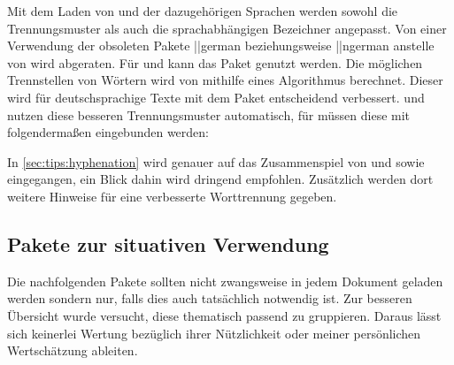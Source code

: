 \begin{DeclarePackages}
  Mit dem Laden von  und der dazugehörigen Sprachen werden 
  sowohl die Trennungsmuster als auch die sprachabhängigen Bezeichner angepasst.
  Von einer Verwendung der obsoleten Pakete \Package||{german} beziehungsweise 
  \Package||{ngerman} anstelle von  wird abgeraten. Für 
   und  kann das Paket  
  genutzt werden.
  Die möglichen Trennstellen von Wörtern wird von  mithilfe 
  eines Algorithmus berechnet. Dieser wird für deutschsprachige Texte mit dem 
  Paket  entscheidend verbessert.  und 
   nutzen diese besseren Trennungsmuster automatisch, für 
   müssen diese mit folgendermaßen eingebunden werden:
  \begin{Code}
    \usepackage[ngerman=ngerman-x-latest]{hyphsubst}
  \end{Code}\vspace{-\baselineskip}%
  In \autoref{sec:tips:hyphenation} wird genauer auf das Zusammenspiel von 
   und  sowie  eingegangen, 
  ein Blick dahin wird dringend empfohlen. Zusätzlich werden dort weitere 
  Hinweise für eine verbesserte Worttrennung gegeben.
\end{DeclarePackages}



\subsection{Pakete zur situativen Verwendung}
%
Die nachfolgenden Pakete sollten nicht zwangsweise in jedem Dokument geladen 
werden sondern nur, falls dies auch tatsächlich notwendig ist. Zur besseren 
Übersicht wurde versucht, diese thematisch passend zu gruppieren. Daraus lässt 
sich keinerlei Wertung bezüglich ihrer Nützlichkeit oder meiner persönlichen 
Wertschätzung ableiten.



